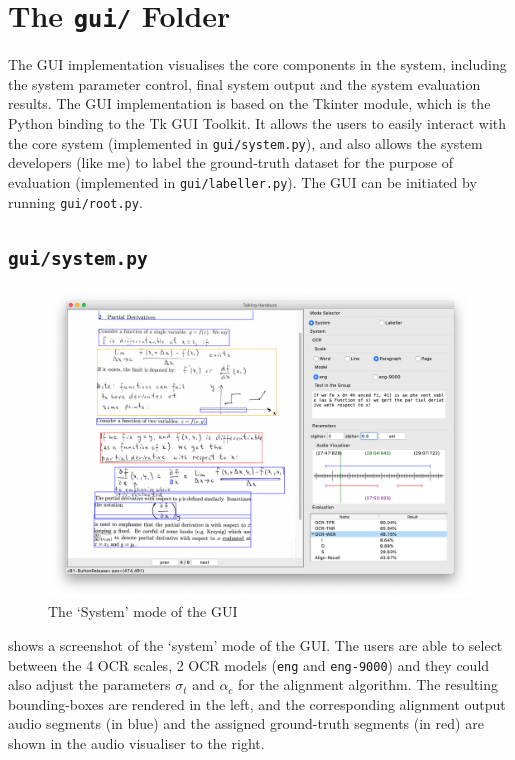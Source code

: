 \section{The \texttt{gui/} Folder}

The GUI implementation visualises the core components in the system, including the system parameter control, final system output and the system evaluation results. The GUI implementation is based on the Tkinter module, which is the Python binding to the Tk GUI Toolkit. It allows the users to easily interact with the core system (implemented in \texttt{gui/system.py}), and also allows the system developers (like me) to label the ground-truth dataset for the purpose of evaluation (implemented in \texttt{gui/labeller.py}). The GUI can be initiated by running \texttt{gui/root.py}.

\subsection{\texttt{gui/system.py}}

\begin{figure}[!ht]
    \centering
    \includegraphics[width=\textwidth]{gui-system.png}
    \caption{The `System' mode of the GUI}
    \label{fig:gui-system}
\end{figure}

 shows a screenshot of the `system' mode of the GUI. The users are able to select between the 4 OCR scales, 2 OCR models (\texttt{eng} and \texttt{eng-9000}) and they could also adjust the parameters $\sigma_t$ and $\alpha_c$ for the alignment algorithm. The resulting bounding-boxes are rendered in the left, and the corresponding alignment output audio segments (in blue) and the assigned ground-truth segments (in red) are shown in the audio visualiser to the right.

